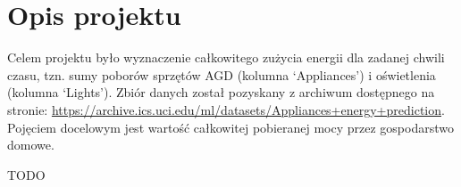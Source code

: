 \documentclass[a4paper,11pt,twoside]{mwrep}  %
\begin{document}
 




\begin{titlepage} 
{\begingroup
\centering 

\vspace*{15\baselineskip} 

{\Huge Metody Odkrywania Wiedzy}
\vspace*{1\baselineskip}

{\huge Dokumentacja końcowa projektu}

\vspace*{3\baselineskip}
{\LARGE „Predykcja zużycia energii na podstawie danych czujnikowych”}
\\[\baselineskip]

\vspace*{20\baselineskip} 
{\Large 
Krzysztof Belewicz\\
Paweł Pieńczuk\par} 

\vspace*{1\baselineskip}
\today

\endgroup\clearpage}
\end{titlepage} 


\large %

\begingroup
\let\clearpage\relax
\chapter{Opis projektu} %

Celem projektu było wyznaczenie całkowitego zużycia energii dla zadanej chwili czasu, tzn. sumy poborów sprzętów AGD (kolumna ‘Appliances’) i oświetlenia (kolumna ‘Lights’). 
Zbiór danych został pozyskany z archiwum dostępnego na stronie: 
{\url{https://archive.ics.uci.edu/ml/datasets/Appliances+energy+prediction}}. Pojęciem docelowym jest wartość całkowitej pobieranej mocy przez gospodarstwo domowe.

TODO

\endgroup
\end{document}
